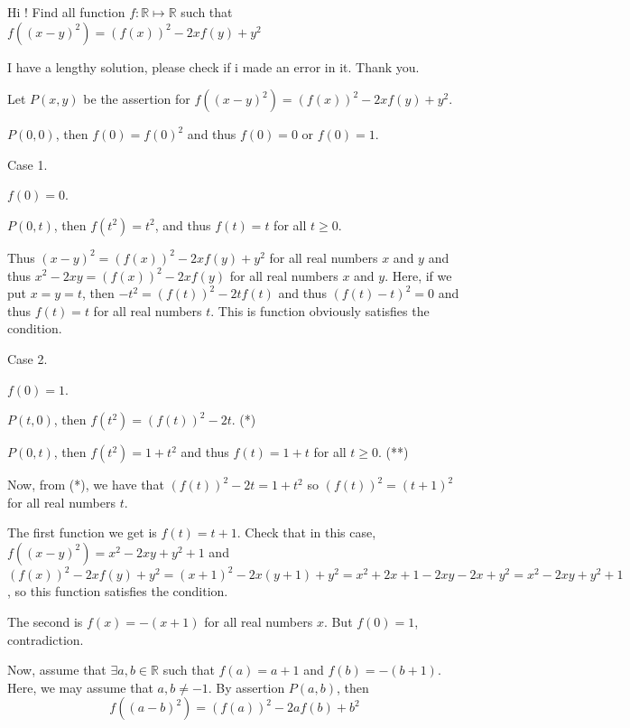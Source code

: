 \begin{solution}
	\begin{tcolorbox}Hi ! Find all function $ f : \mathbb{R}\mapsto\mathbb{R}$ such that $ f((x - y)^2) = (f(x))^2 - 2xf(y) + y^2$\end{tcolorbox}

I have a lengthy solution, please check if i made an error in it. Thank you.

Let $ P(x,y)$ be the assertion for $ f((x - y)^2) = (f(x))^2 - 2xf(y) + y^2$.

$ P(0,0)$, then $ f(0) = f(0)^2$ and thus $ f(0) = 0$ or $ f(0) = 1$.

\begin{italicized}Case 1.\end{italicized} $ f(0) = 0$.

$ P(0,t)$, then $ f(t^2) = t^2$, and thus $ f(t) = t$ for all $ t \ge 0$.

Thus $ (x - y)^2 = (f(x))^2 - 2xf(y) + y^2$ for all real numbers $ x$ and $ y$ and thus $ x^2 - 2xy = (f(x))^2 - 2xf(y)$ for all real numbers $ x$ and $ y$. Here, if we put $ x = y = t$, then $ - t^2 = (f(t))^2 - 2tf(t)$ and thus $ (f(t) - t)^2 = 0$ and thus $ f(t) = t$ for all real numbers $ t$. This is function obviously satisfies the condition.

\begin{italicized}Case 2.\end{italicized} $ f(0) = 1$.

$ P(t,0)$, then $ f(t^2) = (f(t))^2 - 2t$. (*)

$ P(0,t)$, then $ f(t^2) = 1 + t^2$ and thus $ f(t) = 1 + t$ for all $ t \ge 0$. (**)

Now, from (*), we have that $ (f(t))^2 - 2t = 1 + t^2$ so $ (f(t))^2 = (t + 1)^2$ for all real numbers $ t$.

The first function we get is $ f(t) = t + 1$. Check that in this case, $ f((x - y)^2) = x^2 - 2xy + y^2 + 1$ and
\[ (f(x))^2 - 2xf(y) + y^2 = (x + 1)^2 - 2x(y + 1) + y^2 = x^2 + 2x + 1 - 2xy - 2x + y^2 = x^2 - 2xy + y^2 + 1\]
, so this function satisfies the condition.

The second is $ f(x) = - (x + 1)$ for all real numbers $ x$. But $ f(0) = 1$, contradiction.

Now, assume that $ \exists a,b \in \mathbb{R}$ such that $ f(a) = a + 1$ and $ f(b) = - (b + 1)$. Here, we may assume that $ a,b \ne - 1$.
By assertion $ P(a,b)$, then
\[ f((a - b)^2) = (f(a))^2 - 2af(b) + b^2\]


\end{solution}
